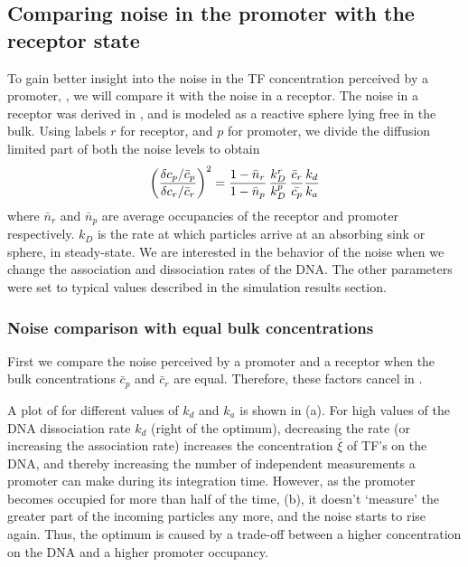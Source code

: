 \subsection{Comparing noise in the promoter with the receptor state}

To gain better insight into the noise in the TF concentration perceived by a promoter, , we will compare it with the noise in a receptor. The noise in a receptor was derived in \cite{DeRonde2012}, and is modeled as a reactive sphere lying free in the bulk. Using labels $r$ for receptor, and $p$ for promoter, we divide the diffusion limited part of both the noise levels to obtain
\begin{equation}
 \left( \frac{\delta c_p / \bar{c}_p}{\delta c_r / \bar{c}_r} \right)^2 = \frac{1-\bar{n}_r}{1-\bar{n}_p} \, \frac{k_D^r}{k_D^p} \, \frac{\bar{c}_r}{\bar{c_p}} \frac{k_d}{k_a}
\elabel{NoiseCmpA}
\end{equation}
where $\bar{n}_r$ and $\bar{n}_p$ are average occupancies of the receptor and promoter respectively. $k_D$ is the rate at which particles arrive at an absorbing sink or sphere, in steady-state. We are interested in the behavior of the noise when we change the association and dissociation rates of the DNA. The other parameters were set to typical values described in the simulation results section. 

\subsubsection{Noise comparison with equal bulk concentrations}
First we compare the noise perceived by a promoter and a receptor when the bulk concentrations $\bar{c}_p$ and $\bar{c}_r$ are equal. Therefore, these factors cancel in .

A plot of  for different values of $k_d$ and $k_a$ is shown in  (a). For high values of the DNA dissociation rate $k_d$ (right of the optimum), decreasing the rate (or increasing the association rate) increases the concentration $\bar{\xi}$ of TF's on the DNA, and thereby increasing the number of independent measurements a promoter can make during its integration time. However, as the promoter becomes occupied for more than half of the time,  (b), it doesn't `measure' the greater part of the incoming particles any more, and the noise starts to rise again. Thus, the optimum is caused by a trade-off between a higher concentration on the DNA and a higher promoter occupancy.

